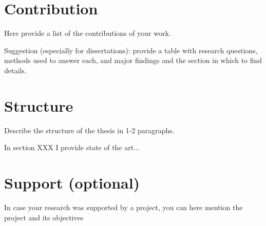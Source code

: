 \section{Contribution} \label{sect.contribution}

Here provide a list of the contributions of your work.

Suggestion (especially for dissertations): provide a table with research questions, methods used to answer each, and major findings and the section in which to find details.

\section{Structure} \label{sect.structure}
Describe the structure of the thesis in 1-2 paragraphs.

In section XXX I provide state of the art...


\section{Support (optional)   } \label{sect.support}
In case your research was supported by a project, you can here mention the project and its objectives

\newpage